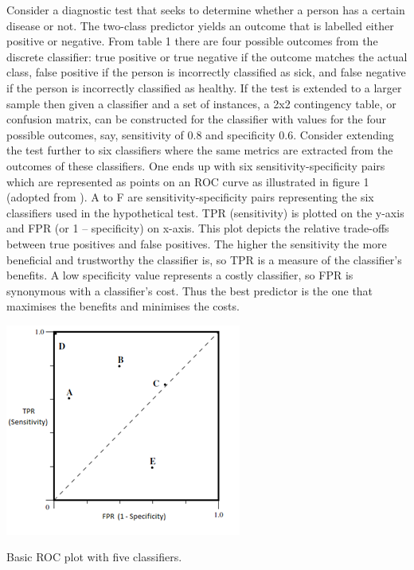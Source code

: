 Consider a diagnostic test that seeks to determine whether a person has a certain disease or not. The two-class predictor yields an outcome that is labelled either positive or negative. From table 1 there are four possible outcomes from the discrete classifier: true positive or true negative if the outcome matches the actual class, false positive if the person is incorrectly classified as sick, and false negative if the person is incorrectly classified as healthy. If the test is extended to a larger sample then given a classifier and a set of instances, a 2x2 contingency table, or confusion matrix, can be constructed for the classifier with values for the four possible outcomes, say, sensitivity of 0.8 and specificity 0.6. Consider extending the test further to six classifiers where the same metrics are extracted from the outcomes of these classifiers. One ends up with six sensitivity-specificity pairs which are represented as points on an ROC curve as illustrated in figure 1 (adopted from \citet{fawcett2006introroc}). A to F are sensitivity-specificity pairs representing the six classifiers used in the hypothetical test. TPR (sensitivity) is plotted on the y-axis and FPR (or 1 – specificity) on x-axis. This plot depicts the relative trade-offs between true positives and false positives. The higher the sensitivity the more beneficial and trustworthy the classifier is, so TPR is a measure of the classifier's benefits. A low specificity value represents a costly classifier, so FPR is synonymous with a classifier's cost. Thus the best predictor is the one that maximises the benefits and minimises the costs. 

\begin{marginfigure}
	\includegraphics{roc_curves/Figure1.png}
	\caption{Basic ROC plot with five classifiers.}
	\label{fig:classifiers-roc}
\end{marginfigure}

